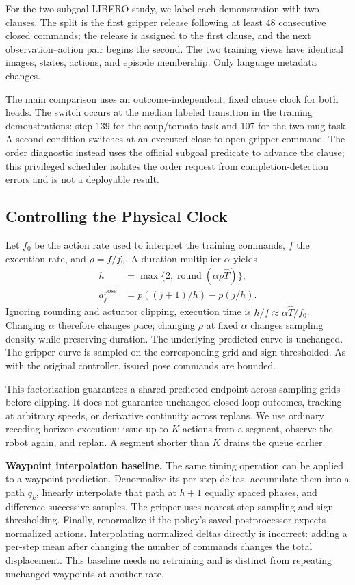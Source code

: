 For the two-subgoal LIBERO study, we label each demonstration with two clauses. The split is the first gripper release following at least 48 consecutive closed commands; the release is assigned to the first clause, and the next observation--action pair begins the second. The two training views have identical images, states, actions, and episode membership. Only language metadata changes.

The main comparison uses an outcome-independent, fixed clause clock for both heads. The switch occurs at the median labeled transition in the training demonstrations: step 139 for the soup/tomato task and 107 for the two-mug task. A second condition switches at an executed close-to-open gripper command. The order diagnostic instead uses the official subgoal predicate to advance the clause; this privileged scheduler isolates the order request from completion-detection errors and is not a deployable result.

\subsection{Controlling the Physical Clock}

Let $f_0$ be the action rate used to interpret the training commands, $f$ the execution rate, and $\rho=f/f_0$. A duration multiplier $\alpha$ yields
\begin{equation}
 \begin{aligned}
 h&=\max\{2,\operatorname{round}(\alpha\rho\widehat T)\},\\
 a_j^{\mathrm{pose}}&=p((j+1)/h)-p(j/h).
 \end{aligned}
 \label{eq:decode}
\end{equation}
Ignoring rounding and actuator clipping, execution time is $h/f\approx\alpha\widehat T/f_0$. Changing $\alpha$ therefore changes pace; changing $\rho$ at fixed $\alpha$ changes sampling density while preserving duration. The underlying predicted curve is unchanged. The gripper curve is sampled on the corresponding grid and sign-thresholded. As with the original controller, issued pose commands are bounded.

This factorization guarantees a shared predicted endpoint across sampling grids before clipping. It does not guarantee unchanged closed-loop outcomes, tracking at arbitrary speeds, or derivative continuity across replans. We use ordinary receding-horizon execution: issue up to $K$ actions from a segment, observe the robot again, and replan. A segment shorter than $K$ drains the queue earlier.

\textbf{Waypoint interpolation baseline.} The same timing operation can be applied to a waypoint prediction. Denormalize its per-step deltas, accumulate them into a path $q_k$, linearly interpolate that path at $h+1$ equally spaced phases, and difference successive samples. The gripper uses nearest-step sampling and sign thresholding. Finally, renormalize if the policy's saved postprocessor expects normalized actions. Interpolating normalized deltas directly is incorrect: adding a per-step mean after changing the number of commands changes the total displacement. This baseline needs no retraining and is distinct from repeating unchanged waypoints at another rate.
